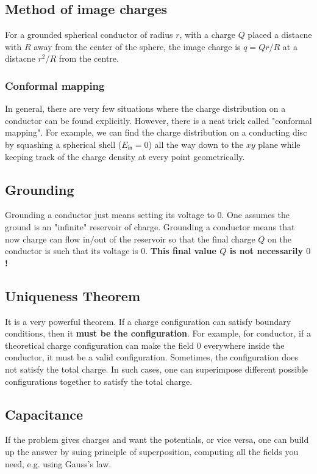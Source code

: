 \subsection{Method of image charges}
For a grounded spherical conductor of radius $r$, with a charge $Q$ placed a distacne with $R$ away from the center of the sphere, the image charge is $q=Qr/R$ at a distacne $r^2/R$ from the centre.

\subsubsection{Conformal mapping}
In general, there are very few situations where the charge distribution on a conductor can be found explicitly. However, there is a neat trick called "conformal mapping". For example, we can find the charge distribution on a conducting disc by squashing a spherical shell ($E_\textsf{in}=0$) all the way down to the $xy$ plane while keeping track of the charge density at every point geometrically.

\subsection{Grounding}
Grounding a conductor just means setting its voltage to $0$. One assumes the ground is an "infinite" reservoir of charge. Grounding a conductor means that now charge can flow in/out of the reservoir so that the final charge $Q$ on the conductor is such that its voltage is $0$. \textbf{This final value $Q$ is not necessarily $0$!}

\subsection{Uniqueness Theorem}
It is a very powerful theorem. If a charge configuration can satisfy boundary conditions, then it \textbf{must be the configuration}. For example, for conductor, if a theoretical charge configuration can make the field 0 everywhere inside the conductor, it must be a valid configuration. Sometimes, the configuration does not satisfy the total charge. In such cases, one can superimpose different possible configurations together to satisfy the total charge. 

\subsection{Capacitance}
If the problem gives charges and want the potentials, or vice versa, one can build up the answer by suing principle of superposition, computing all the fields you need, e.g. using Gauss's law. 

